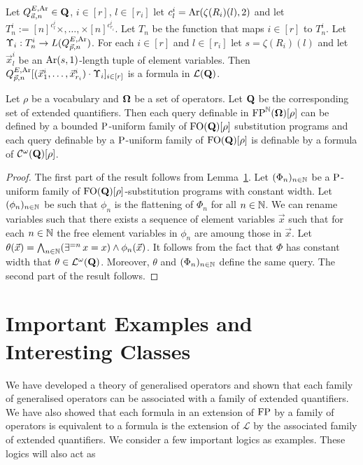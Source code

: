 \documentclass[../main/thesis.tex]{subfiles}
\begin{document}
\begin{textbox}[14.0cm]
  Let $Q^{E, \text{\upshape Ar}}_{\vec{a}, n} \in \mathbf{Q}$, $i \in [r]$, $l \in [r_i]$ let
  $c^i_l = \text{\upshape Ar}(\zeta(R_i)(l), 2)$ and let $T^i_n := [n]^{c^i_l} \times , \ldots,
  \times [n]^{c^i_{r_i}}$. Let $T_n$ be the function that maps $i \in [r]$ to
  $T^i_n$. Let $\Upsilon_i : T^i_n \rightarrow L(Q^{E, \text{\upshape Ar}}_{\vec{p}, n})$. For each $i
  \in [r]$ and $l \in [r_i]$ let $s = \zeta (R_i)(l)$ and let $\vec{x}^i_l$ be
  an $\text{\upshape Ar}(s, 1)$-length tuple of element variables. Then $Q^{E, \text{\upshape Ar}}_{\vec{p},
    n} [(\vec{x}^i_1, \ldots, \vec{x}^i_{r_i}) \cdot \Upsilon_i]_{i \in [r]}$ is
  a formula in $\mathcal{L}(\mathbf{Q})$.
\end{textbox}

\begin{prop}
  Let $\rho$ be a vocabulary and $\mathbf{\mathbf{\Omega}}$ be a set of operators. Let $\mathbf{Q}$
  be the corresponding set of extended quantifiers. Then each query definable in
  $\text{\upshape FP}^{\mathbb{N}}(\mathbf{\mathbf{\Omega}})[\rho]$ can be defined by a bounded $\mathrm{P}$-uniform family
  of $\text{\upshape FO}(\mathbf{Q})[\rho]$ substitution programs and each query definable by a
  $\mathrm{P}$-uniform family of $\text{\upshape FO}(\mathbf{Q})[\rho]$ is definable by a formula of
  $\mathcal{C}^{\omega}(\mathbf{Q})[\rho]$.
\end{prop}
\begin{proof}
  The first part of the result follows from Lemma~\ref{}. Let $(\Phi_n)_{n \in
    \mathbb{N}}$ be a $\mathrm{P}$-uniform family of $\text{\upshape FO}(\mathbf{Q})[\rho]$-substitution
  programs with constant width. Let $(\phi_n)_{n \in \mathbb{N}}$ be such that
  $\phi_n$ is the flattening of $\Phi_n$ for all $n \in \mathbb{N}$. We can rename
  variables such that there exists a sequence of element variables $\vec{x}$
  such that for each $n \in \mathbb{N}$ the free element variables in $\phi_n$ are
  amoung those in $\vec{x}$. Let $\theta (\vec{x}) = \bigwedge_{n \in \mathbb{N}}
  (\exists^{=n} \, x = x) \land \phi_n (\vec{x})$. It follows from the fact that
  $\Phi$ has constant width that $\theta \in \mathcal{L}^\omega(\mathbf{Q})$.
  Moreover, $\theta$ and $(\Phi_n)_{n \in \mathbb{N}}$ define the same query. The
  second part of the result follows.
\end{proof}

\section{Important Examples and Interesting Classes}
We have developed a theory of generalised operators and shown that each family
of generalised operators can be associated with a family of extended
quantifiers. We have also showed that each formula in an extension of $\text{\upshape FP}$ by a
family of operators is equivalent to a formula is the extension of $\mathcal{L}$
by the associated family of extended quantifiers. We consider a few important
logics as examples. These logics will also act as 
\end{document}
